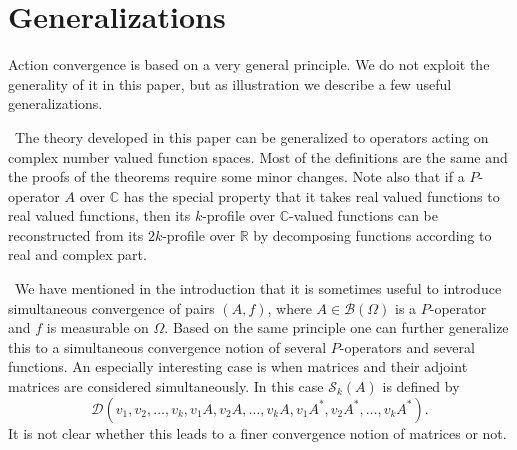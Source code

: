 \documentclass[a4wider]{amsart}
\theoremstyle{definitionbreak}\newtheorem{D}[theorem]{Definition}
\theoremstyle{definitionbreak}\newtheorem*{D*}{Definition}
\begin{document}






\section{Generalizations}

Action convergence is  based on a very general principle. We do not exploit the generality of it in this paper, but as illustration we describe a few useful generalizations.

~The theory developed in this paper can be generalized to operators acting on complex number valued function spaces. Most of the definitions are the same and the proofs of the theorems require some minor changes. Note also that if a $P$-operator $A$ over $\mathbb{C}$ has the special property that it takes real valued functions to real valued functions, then its $k$-profile over $\mathbb{C}$-valued functions can be reconstructed from its $2k$-profile over $\mathbb{R}$ by decomposing functions according to real and complex part. 

~We have mentioned in the introduction that it is sometimes useful to introduce simultaneous convergence of pairs $(A,f)$, where $A\in\mathcal{B}(\Omega)$ is a $P$-operator and $f$ is measurable on $\Omega$. Based on the same principle one can further generalize this to a simultaneous convergence notion of several $P$-operators and several functions. An especially interesting case is when matrices and their adjoint matrices are considered simultaneously. In this case $\mathcal{S}_k(A)$ is defined by
$$\mathcal{D}(v_1,v_2,\dots,v_k,v_1A,v_2A,\dots,v_kA,v_1A^*,v_2A^*,\dots,v_kA^*).$$ It is not clear whether this leads to a finer convergence notion of matrices or not.
\end{document}
